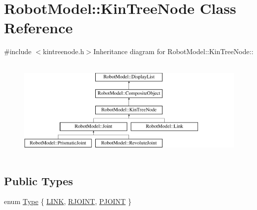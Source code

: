 \hypertarget{class_robot_model_1_1_kin_tree_node}{
\section{RobotModel::KinTreeNode Class Reference}
\label{class_robot_model_1_1_kin_tree_node}
}


{\ttfamily \#include $<$kintreenode.h$>$}Inheritance diagram for RobotModel::KinTreeNode::\begin{figure}[H]
\begin{center}
\leavevmode
\includegraphics[height=4.96454cm]{class_robot_model_1_1_kin_tree_node}
\end{center}
\end{figure}
\subsection*{Public Types}
\begin{DoxyCompactItemize}
\item 
enum \hyperlink{class_robot_model_1_1_kin_tree_node_a6cc10fb82046bd1d9f61b806756ad176}{Type} \{ \hyperlink{class_robot_model_1_1_kin_tree_node_a6cc10fb82046bd1d9f61b806756ad176a7f93636bcf2ed7eff9b36ed8da60777a}{LINK}, 
\hyperlink{class_robot_model_1_1_kin_tree_node_a6cc10fb82046bd1d9f61b806756ad176a04cef19c06748b4e24b11813c61c8105}{RJOINT}, 
\hyperlink{class_robot_model_1_1_kin_tree_node_a6cc10fb82046bd1d9f61b806756ad176a73c47d9082d873a40490ad0efb9a5176}{PJOINT}
 \}
\end{DoxyCompactItemize}
